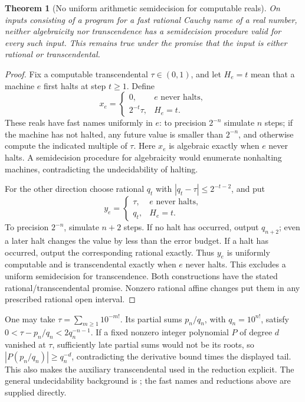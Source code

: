 \documentclass[11pt,a4paper]{article}
\newtheorem{theorem}{Theorem}[section]
\theoremstyle{definition}
\theoremstyle{remark}
\numberwithin{equation}{section}
\begin{document}
\begin{theorem}[No uniform arithmetic semidecision for computable reals]
\label{wr:thm-no-generic-decider}
On inputs consisting of a program for a fast rational Cauchy name of a
real number, neither algebraicity nor transcendence has a semidecision
procedure valid for every such input. This remains true under the
promise that the input is either rational or transcendental.
\end{theorem}
\begin{proof}
Fix a computable transcendental \(\tau\in(0,1)\), and let \(H_e=t\)
mean that a machine \(e\) first halts at step \(t\ge1\). Define
\[
 x_e=\begin{cases}0,&e\text{ never halts},\\2^{-t}\tau,&H_e=t.
 \end{cases}
\]
These reals have fast names uniformly in \(e\): to precision \(2^{-n}\)
simulate \(n\) steps; if the machine has not halted, any future value
is smaller than \(2^{-n}\), and otherwise compute the indicated multiple
of \(\tau\). Here \(x_e\) is algebraic exactly when \(e\) never halts.
A semidecision procedure for algebraicity would enumerate nonhalting
machines, contradicting the undecidability of halting.

For the other direction choose rational \(q_t\) with
\(|q_t-\tau|\le2^{-t-2}\), and put
\[
 y_e=\begin{cases}\tau,&e\text{ never halts},\\q_t,&H_e=t.
 \end{cases}
\]
To precision \(2^{-n}\), simulate \(n+2\) steps. If no halt has occurred,
output \(q_{n+2}\); even a later halt changes the value by less than
the error budget. If a halt has occurred, output the corresponding
rational exactly. Thus \(y_e\) is uniformly computable and is
transcendental exactly when \(e\) never halts. This excludes a uniform
semidecision for transcendence. Both constructions have the stated
rational/transcendental promise. Nonzero rational affine changes put
them in any prescribed rational open interval.
\end{proof}

One may take \(\tau=\sum_{m\ge1}10^{-m!}\). Its partial sums
\(p_n/q_n\), with \(q_n=10^{n!}\), satisfy
\(0<\tau-p_n/q_n<2q_n^{-n-1}\). If a fixed nonzero integer polynomial
\(P\) of degree \(d\) vanished at \(\tau\), sufficiently late partial
sums would not be its roots, so \(|P(p_n/q_n)|\ge q_n^{-d}\),
contradicting the derivative bound times the displayed tail. This also
makes the auxiliary transcendental used in the reduction explicit.
The general undecidability background is \cite{wr:turing}; the fast
names and reductions above are supplied directly.
\end{document}
